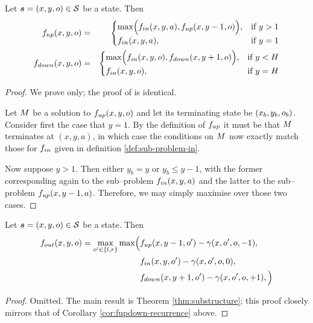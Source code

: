 \begin{corollary}
  \label{cor:fupdown-recurrence}
  Let $\State=(x,y,\WallOrient)\in\StateSpace$ be a state. Then
  \begin{eqnarray}
    \label{eq:fup-recurrence}
    \SubProbUP(x,y,\WallOrient) &=& 
    \begin{cases}
      \max \Bigl(\SubProbIN(x,y,a),
      \SubProbUP(x,y-1,\WallOrient) \Bigr), &
      \mbox{if } y > 1 \\
      \SubProbIN(x,y,a), & \mbox{if } y=1
    \end{cases}\\
    \label{eq:fdown-recurrence}
    \SubProbDOWN(x,y,\WallOrient) &=& 
    \begin{cases}
      \max \Bigl(\SubProbIN(x,y,\WallOrient),
      \SubProbDOWN(x,y+1,\WallOrient) \Bigr), &
      \mbox{if } y < H \\
      \SubProbIN(x,y,\WallOrient), & \mbox{if } y=H
    \end{cases}
  \end{eqnarray}
\end{corollary}
\begin{proof}
  We prove  only; the proof of
   is identical.

  Let $\Scene$ be a solution to $\SubProbUP(x,y,\WallOrient)$ and let
  its terminating state be $(x_b,y_b,\WallOrient_b)$. Consider first
  the case that $y=1$. By the definition of $\SubProbUP$ it must be
  that $\Scene$ terminates at $(x,y,a)$, in which case the
  conditions on $\Scene$ now exactly match those for $\SubProbIN$
  given in definition \ref{def:sub-problem-in}.

  Now suppose $y>1$. Then either $y_b=y$ or $y_b \leq y-1$, with the
  former corresponding again to the sub--problem $\SubProbIN(x,y,a)$
  and the latter to the sub--problem $\SubProbUP(x,y-1,a)$. Therefore,
  we may simply maximise over those two cases.
\end{proof}  

\begin{corollary}
  \label{cor:fout-recurrence}
  Let $\State=(x,y,\WallOrient)\in\StateSpace$ be a state. Then
  \begin{equation}
    \begin{split}
      \label{eq:fout-recurrence}
      \SubProbOUT(x,y,\WallOrient) = 
      \max_{\WallOrient'\in\{l,r\}} \max \Bigl(
      &\SubProbUP(x,y-1,\WallOrient')
      - \CornerPenalty(x,\WallOrient',\WallOrient,-1),\\
      &\SubProbIN(x,y,\WallOrient')
      - \CornerPenalty(x,\WallOrient',\WallOrient,0),\\
      &\SubProbDOWN(x,y+1,\WallOrient')
      - \CornerPenalty(x,\WallOrient',\WallOrient,+1),
      \Bigr)
    \end{split}
  \end{equation}
\end{corollary}
\begin{proof}
  Omitted. The main result is Theorem \ref{thm:substructure}; this proof
  closely mirrors that of Corollary \ref{cor:fupdown-recurrence} above.
\end{proof}

